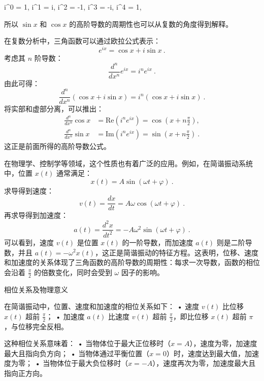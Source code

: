i^0 = 1, \quad i^1 = i, \quad i^2 = -1, \quad i^3 = -i, \quad i^4 = 1,

所以 $\sin x$ 和 $\cos x$ 的高阶导数的周期性也可以从复数的角度得到解释。

在复数分析中，三角函数可以通过欧拉公式表示：
\begin{equation}
e^{ix} = \cos x + i\sin x~.
\end{equation}
考虑其 $n$ 阶导数：
\begin{equation}
\frac{d^n}{dx^n} e^{ix} = i^n e^{ix}~.
\end{equation}
由此可得：
\begin{equation}
\frac{d^n}{dx^n} (\cos x + i \sin x) = i^n (\cos x + i \sin x)~.
\end{equation}
将实部和虚部分离，可以推出：
\begin{align*}
\frac{d^n}{dx^n} \cos x &= \text{Re} (i^n e^{ix}) = \cos(x + n\frac{\pi}{2}), \\
\frac{d^n}{dx^n} \sin x &= \text{Im} (i^n e^{ix}) = \sin(x + n\frac{\pi}{2})~.
\end{align*}
这正是前面所得的高阶导数公式。

在物理学、控制学等领域，这个性质也有着广泛的应用。例如，在简谐振动系统中，位置 $x(t)$ 通常满足：
\begin{equation}
x(t) = A \sin(\omega t + \varphi)~.
\end{equation}
求导得到速度：
\begin{equation}
v(t) = \frac{dx}{dt} = A\omega \cos(\omega t + \varphi)~.
\end{equation}
再求导得到加速度：
\begin{equation}
a(t) = \frac{d^2x}{dt^2} = -A\omega^2 \sin(\omega t + \varphi)~.
\end{equation}
可以看到，速度 $v(t)$ 是位置 $x(t)$ 的一阶导数，而加速度 $a(t)$ 则是二阶导数，并且 $a(t) = -\omega^2 x(t)$，这正是简谐振动的特征方程。这表明，位移、速度和加速度的关系体现了三角函数的高阶导数的周期性：每求一次导数，函数的相位会沿着 $\frac{\pi}{2}$ 的倍数变化，同时会受到 $\omega$ 因子的影响。

相位关系及物理意义

在简谐振动中，位置、速度和加速度的相位关系如下：
	•	速度 $v(t)$ 比位移 $x(t)$ 超前 $\frac{\pi}{2}$；
	•	加速度 $a(t)$ 比速度 $v(t)$ 超前 $\frac{\pi}{2}$，即比位移 $x(t)$ 超前 $\pi$，与位移完全反相。

这种相位关系意味着：
	•	当物体位于最大正位移时（$x = A$），速度为零，加速度最大且指向负方向；
	•	当物体通过平衡位置（$x = 0$）时，速度达到最大值，加速度为零；
	•	当物体位于最大负位移时（$x = -A$），速度再次为零，加速度最大且指向正方向。

